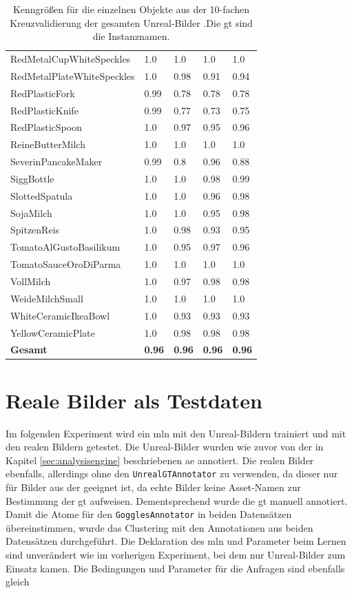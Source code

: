\begin{table}
\begin{tabularx}{\textwidth}{Xllll}
RedMetalCupWhiteSpeckles & 1.0 & 1.0 & 1.0 & 1.0 \\  
RedMetalPlateWhiteSpeckles & 1.0 & 0.98 & 0.91 & 0.94 \\  
RedPlasticFork & 0.99 & 0.78 & 0.78 & 0.78 \\  
RedPlasticKnife & 0.99 & 0.77 & 0.73 & 0.75 \\  
RedPlasticSpoon & 1.0 & 0.97 & 0.95 & 0.96 \\  
ReineButterMilch & 1.0 & 1.0 & 1.0 & 1.0 \\  
SeverinPancakeMaker & 0.99 & 0.8 & 0.96 & 0.88 \\  
SiggBottle & 1.0 & 1.0 & 0.98 & 0.99 \\  
SlottedSpatula & 1.0 & 1.0 & 0.96 & 0.98 \\  
SojaMilch & 1.0 & 1.0 & 0.95 & 0.98 \\  
SpitzenReis & 1.0 & 0.98 & 0.93 & 0.95 \\  
TomatoAlGustoBasilikum & 1.0 & 0.95 & 0.97 & 0.96 \\  
TomatoSauceOroDiParma & 1.0 & 1.0 & 1.0 & 1.0 \\  
VollMilch & 1.0 & 0.97 & 0.98 & 0.98 \\  
WeideMilchSmall & 1.0 & 1.0 & 1.0 & 1.0 \\  
WhiteCeramicIkeaBowl & 1.0 & 0.93 & 0.93 & 0.93 \\  
YellowCeramicPlate & 1.0 & 0.98 & 0.98 & 0.98 \\    \hline
\textbf{Gesamt}		&	\textbf{0.96}   &	\textbf{0.96}  & \textbf{0.96}     &  \textbf{0.96}     \\
\end{tabularx}
\caption[Objektinstanzen-spezifische Kenngrößen des gesamten Unreal-Bilder Datensatzes]{Kenngrößen für die einzelnen Objekte aus der 10-fachen Kreuzvalidierung der gesamten Unreal-Bilder .Die \gls{gt} sind die Instanznamen.}
\label{tab:UnrealGTInstance_metrics}
\end{table}

\section{Reale Bilder als Testdaten}

Im folgenden Experiment wird ein \gls{mln} mit den Unreal-Bildern trainiert und mit den realen Bildern getestet. Die Unreal-Bilder wurden wie zuvor von der in Kapitel \ref{sec:analysisengine} beschriebenen \gls{ae} annotiert. Die realen Bilder ebenfalls, allerdings ohne den \texttt{UnrealGTAnnotator} zu verwenden, da dieser nur für Bilder aus der \unreal geeignet ist, da echte Bilder keine Asset-Namen zur Bestimmung der \gls{gt} aufweisen. Dementsprechend wurde die \gls{gt} manuell annotiert. Damit die Atome für den \texttt{GogglesAnnotator} in beiden Datensätzen übereinstimmen, wurde das Clustering mit den Annotationen aus beiden Datensätzen durchgeführt. Die Deklaration des \gls{mln} und Parameter beim Lernen sind unverändert wie im vorherigen Experiment, bei dem nur Unreal-Bilder zum Einsatz kamen. Die Bedingungen und Parameter für die Anfragen sind ebenfalls gleich \par

